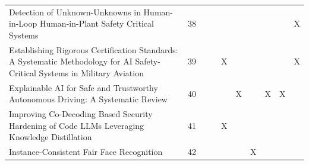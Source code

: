 \begin{landscape}
\begin{longtable}{|p{14cm}|c|c|c|c|c|c|c|c|c|}
		Detection of Unknown-Unknowns in Human-in-Loop Human-in-Plant Safety Critical Systems                                                                   & 38          &                                    &                                                           &                                                       &                                                            &                                           &                                              &                                                    & X                                  \\
		Establishing Rigorous Certification Standards: A Systematic Methodology for AI Safety-Critical Systems in Military Aviation                             & 39          &                                    &                                                           & X                                                     &                                                            &                                           &                                              &                                                    & X                                  \\
		Explainable AI for Safe and Trustworthy Autonomous Driving: A Systematic Review                                                                         & 40          &                                    &                                                           &                                                       & X                                                          &                                           & X                                            & X                                                  &                                    \\
		Improving Co-Decoding Based Security Hardening of Code LLMs Leveraging Knowledge Distillation                                                           & 41          &                                    &                                                           & X                                                     &                                                            &                                           &                                              &                                                    &                                    \\
		Instance-Consistent Fair Face Recognition                                                                                                               & 42          &                                    &                                                           &                                                       &                                                            & X                                         &                                              &                                                    &                                    \\

\end{longtable}
\end{landscape}
